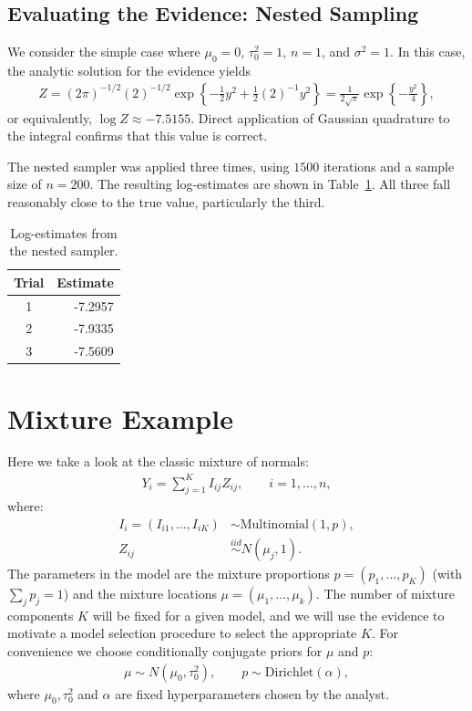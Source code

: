 \documentclass[11pt]{article}
\newcommand{\iid}{\stackrel{iid}{\sim}}
\begin{document}
\subsection{Evaluating the Evidence: Nested Sampling}
We consider the simple case where $\mu_{0}=0$, $\tau_{0}^{2}=1$, $n=1$,
and $\sigma^{2}=1$.
In this case, the analytic solution for the evidence yields
\begin{align*}
Z = (2\pi)^{-1/2}\left(2\right)^{-1/2}\exp\left\{ - \frac{1}{2}y^{2} + \frac{1}{2}\left(2\right)^{-1}y^{2}\right\}  = \frac{1}{2\sqrt{\pi}}\exp\left\{-\frac{y^{2}}{4}\right\},
\end{align*}
or equivalently, $\log Z \approx -7.5155$.
Direct application of Gaussian quadrature to the integral confirms that
this value is correct.

The nested sampler was applied three times, 
using $1500$ iterations and a sample size of $n = 200$.
The resulting log-estimates are shown in Table~\ref{tab:toy.est}.
All three fall reasonably close to the true value, particularly the third.

    \begin{table}[ht]
    \centering
    \begin{tabular}{cr}
        \toprule
        Trial & Estimate \\
        \midrule
        1 & -7.2957 \\
        2 & -7.9335 \\
        3 & -7.5609 \\
        \bottomrule
    \end{tabular}
    \caption{Log-estimates from the nested sampler.}
    \label{tab:toy.est}
    \end{table}

\section{Mixture Example}
Here we take a look at the classic mixture of normals:
\begin{align*}
 Y_{i} = \sum_{j=1}^{K}I_{ij}Z_{ij} , \qquad i=1,\ldots,n , 
\end{align*}
where:
\begin{align*}
 I_{i} = (I_{i1},\ldots,I_{iK}) &\sim \textrm{Multinomial}\left(1,p\right) , \\ 
 Z_{ij} &\iid N\left(\mu_{j},1\right) .
\end{align*}
The parameters in the model are the mixture proportions $p=(p_{1},\ldots,p_{K})$ (with $\sum_{j}p_{j}=1$) and the mixture locations $\mu=(\mu_{1},\ldots,\mu_{k})$. The number of mixture components $K$ will be fixed for a given model, and we will use the evidence to motivate a model selection procedure to select the appropriate $K$. For convenience we choose conditionally conjugate priors for $\mu$ and $p$:
\begin{align*}
    \mu \sim N (\mu_{0},\tau_{0}^{2}), 
    \qquad 
    p \sim \textrm{Dirichlet}(\alpha),
    \end{align*}
where $\mu_{0}, \tau_{0}^{2}$ and $\alpha$ are fixed hyperparameters chosen
by the analyst.
\end{document}
